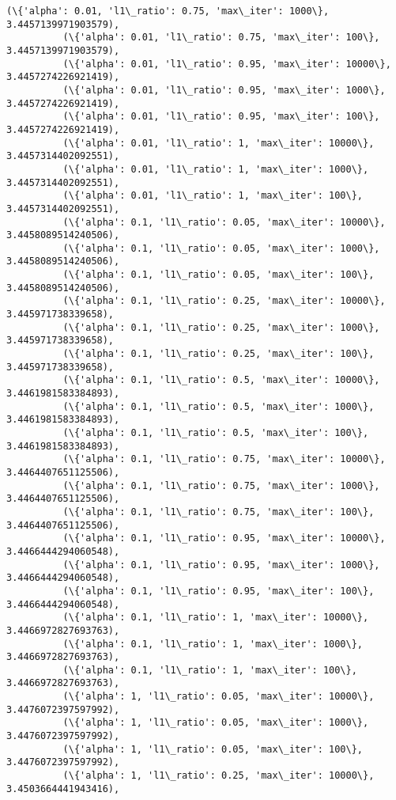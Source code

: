 \documentclass[11pt]{article}
\begin{document}
\begin{Verbatim}[commandchars=\\\{\}]
          (\{'alpha': 0.01, 'l1\_ratio': 0.75, 'max\_iter': 1000\}, 3.4457139971903579),
          (\{'alpha': 0.01, 'l1\_ratio': 0.75, 'max\_iter': 100\}, 3.4457139971903579),
          (\{'alpha': 0.01, 'l1\_ratio': 0.95, 'max\_iter': 10000\}, 3.4457274226921419),
          (\{'alpha': 0.01, 'l1\_ratio': 0.95, 'max\_iter': 1000\}, 3.4457274226921419),
          (\{'alpha': 0.01, 'l1\_ratio': 0.95, 'max\_iter': 100\}, 3.4457274226921419),
          (\{'alpha': 0.01, 'l1\_ratio': 1, 'max\_iter': 10000\}, 3.4457314402092551),
          (\{'alpha': 0.01, 'l1\_ratio': 1, 'max\_iter': 1000\}, 3.4457314402092551),
          (\{'alpha': 0.01, 'l1\_ratio': 1, 'max\_iter': 100\}, 3.4457314402092551),
          (\{'alpha': 0.1, 'l1\_ratio': 0.05, 'max\_iter': 10000\}, 3.4458089514240506),
          (\{'alpha': 0.1, 'l1\_ratio': 0.05, 'max\_iter': 1000\}, 3.4458089514240506),
          (\{'alpha': 0.1, 'l1\_ratio': 0.05, 'max\_iter': 100\}, 3.4458089514240506),
          (\{'alpha': 0.1, 'l1\_ratio': 0.25, 'max\_iter': 10000\}, 3.445971738339658),
          (\{'alpha': 0.1, 'l1\_ratio': 0.25, 'max\_iter': 1000\}, 3.445971738339658),
          (\{'alpha': 0.1, 'l1\_ratio': 0.25, 'max\_iter': 100\}, 3.445971738339658),
          (\{'alpha': 0.1, 'l1\_ratio': 0.5, 'max\_iter': 10000\}, 3.4461981583384893),
          (\{'alpha': 0.1, 'l1\_ratio': 0.5, 'max\_iter': 1000\}, 3.4461981583384893),
          (\{'alpha': 0.1, 'l1\_ratio': 0.5, 'max\_iter': 100\}, 3.4461981583384893),
          (\{'alpha': 0.1, 'l1\_ratio': 0.75, 'max\_iter': 10000\}, 3.4464407651125506),
          (\{'alpha': 0.1, 'l1\_ratio': 0.75, 'max\_iter': 1000\}, 3.4464407651125506),
          (\{'alpha': 0.1, 'l1\_ratio': 0.75, 'max\_iter': 100\}, 3.4464407651125506),
          (\{'alpha': 0.1, 'l1\_ratio': 0.95, 'max\_iter': 10000\}, 3.4466444294060548),
          (\{'alpha': 0.1, 'l1\_ratio': 0.95, 'max\_iter': 1000\}, 3.4466444294060548),
          (\{'alpha': 0.1, 'l1\_ratio': 0.95, 'max\_iter': 100\}, 3.4466444294060548),
          (\{'alpha': 0.1, 'l1\_ratio': 1, 'max\_iter': 10000\}, 3.4466972827693763),
          (\{'alpha': 0.1, 'l1\_ratio': 1, 'max\_iter': 1000\}, 3.4466972827693763),
          (\{'alpha': 0.1, 'l1\_ratio': 1, 'max\_iter': 100\}, 3.4466972827693763),
          (\{'alpha': 1, 'l1\_ratio': 0.05, 'max\_iter': 10000\}, 3.4476072397597992),
          (\{'alpha': 1, 'l1\_ratio': 0.05, 'max\_iter': 1000\}, 3.4476072397597992),
          (\{'alpha': 1, 'l1\_ratio': 0.05, 'max\_iter': 100\}, 3.4476072397597992),
          (\{'alpha': 1, 'l1\_ratio': 0.25, 'max\_iter': 10000\}, 3.4503664441943416),

\end{Verbatim}
\end{document}
